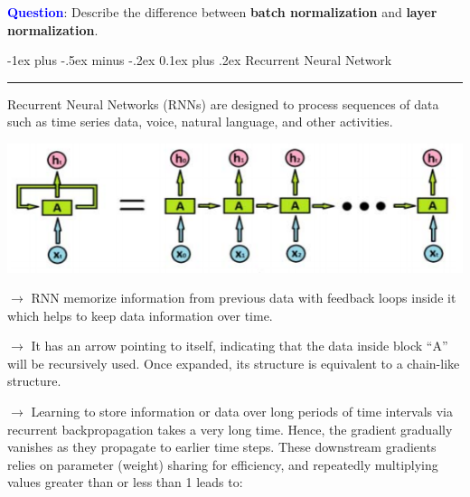 \documentclass[letterpaper, 10.5pt,landscape]{article}
\makeatletter
\renewcommand{\section}{\@startsection{section}{1}{0mm}%
                                {-1ex plus -.5ex minus -.2ex}%
                                {0.1ex plus .2ex}%
                                {\normalfont\small}}
\makeatother
\begin{document}
\begin{multicols*}{3}
\vspace{3pt}
\textbf{\textcolor{blue}{Question}}: Describe the difference between \textbf{batch normalization} and \textbf{layer normalization}.


\vspace*{\fill}

\columnbreak




\section{Recurrent Neural Network} {\color{teal}\hrule height 1pt} \smallskip


Recurrent Neural Networks (RNNs) are designed to process sequences of data such as time series data, voice, natural language, and other activities.





\vspace{-5pt}

\begin{center}
    \begin{minipage}{0.75\linewidth}
    \includegraphics[width=\textwidth]{figures/RNNLoop.png}
    \end{minipage}
\end{center}
\vspace{-5pt}


$\rightarrow$ RNN memorize information from previous data with feedback loops inside it which helps to keep data information over time.


$\rightarrow$ It has an arrow pointing to itself, indicating that the data inside block “A” will be recursively used. Once expanded, its structure is equivalent to a chain-like structure. 

$\rightarrow$ Learning to store information or data over long periods of time intervals via recurrent backpropagation takes a very long time. Hence, the gradient gradually vanishes as they propagate to earlier time steps. These downstream gradients relies on parameter (weight) sharing for efficiency, and repeatedly multiplying values greater than or less than 1 leads to:


\end{multicols*}
\end{document}
